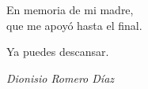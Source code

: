 
\cleardoublepage
\thispagestyle{empty} %

\begin{minipage}[c][\textheight][c]{\textwidth} %
\raggedleft %

En memoria de mi madre,\\
que me apoyó hasta el final.

\bigskip

Ya puedes descansar.

\bigskip

\emph{Dionisio Romero Díaz}

\end{minipage}

\blankpage
